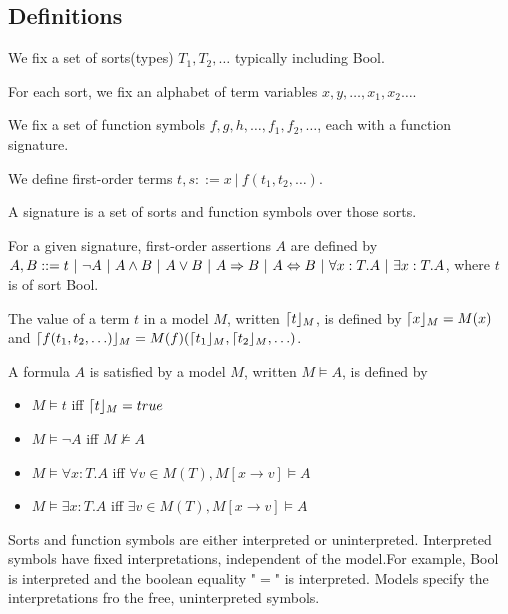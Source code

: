 \subsection{Definitions}
\begin{mytitle}[Sort] We fix a set of sorts(types) $T_1, T_2, \ldots$ typically including Bool.
\end{mytitle}
\begin{mytitle} For each sort, we fix an alphabet of term variables $x, y, \ldots, x_1, x_2 \ldots$.
\end{mytitle}
\begin{mytitle} We fix a set of function symbols $f, g, h, \ldots, f_1, f_2, \ldots$, each with a function signature.
\end{mytitle}
\begin{mytitle} We define first-order terms $t, s::= x\ |\ f(t_1, t_2,\ldots)$.
\end{mytitle}
\begin{mytitle}[Signature] A signature is a set of sorts and function symbols over those sorts.
\end{mytitle}
\begin{mytitle} For a given signature, first-order assertions $A$ are defined by $A, B ::= t\ |\ \lnot A\ |\ A\land B\ |\ A\lor B\ |\ A\To B\ |\ A\Leftrightarrow B\ |\ \forall x:T.A\ |\ \exists x: T.A$, where $t$ is of sort Bool. 
\end{mytitle}
\begin{mytitle} The value of a term $t$ in a model $M$, written $\lceil t\rfloor_M$, is defined by $\lceil x\rfloor_M=M(x)$ and $\lceil f(t_1, t_2, \ldots)\rfloor_M=M(f)(\lceil t_1\rfloor_M, \lceil t_2\rfloor_M, \ldots)$.
\end{mytitle}
\begin{mytitle}[Satisfaction] A formula $A$ is satisfied by a model $M$, written $M\models A$, is defined by 
\begin{itemize}
    \item $M\models t$ iff $\lceil t\rfloor_M=true$
    \item $M\models \lnot A$ iff $M\not\models A$
    \item $M\models \forall x: T.A$ iff $\forall v\in M(T), M[x \to v]\models A$
    \item $M\models \exists x: T.A$ iff $\exists v\in M(T), M[x \to v]\models A$
\end{itemize}
\end{mytitle}
\begin{mytitle}[Interpretation] Sorts and function symbols are either interpreted or uninterpreted. Interpreted symbols have fixed interpretations, independent of the model.For example, Bool is interpreted and the boolean equality "$=$" is interpreted. Models specify the interpretations fro the free, uninterpreted symbols.
\end{mytitle}

